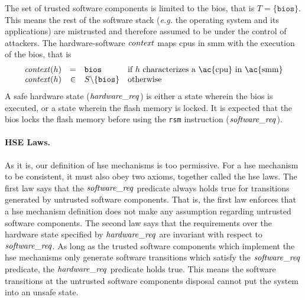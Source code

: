 \begin{example}
  \label{example:speccert:flashdef}
  The set of trusted software components is limited to the \ac{bios}, that is
  \( T = \{ \mathtt{bios} \} \).
  This means the rest of the software stack (\emph{e.g.} the operating system
  and its applications) are mistrusted and therefore assumed to be under the
  control of attackers.
  The hardware-software \( \mathit{context} \) maps \acp{cpu} in \ac{smm} with the
  execution of the \ac{bios}, that is
  \[
    \begin{array}{rcll}
      \func{context}(h) & = & \mathtt{bios} & \text{if } h \text{ characterizes
                                              a \ac{cpu} in \ac{smm}} \\
      \func{context}(h) & \in & S \backslash \{ \mathtt{bios} \} & \text{otherwise}
    \end{array}
  \]
  A safe hardware state ($\mathit{hardware\_req}$) is either a state wherein the
  \ac{bios} is executed, or a state wherein the flash memory is locked.
  It is expected that the \ac{bios} locks the flash memory before using the
  \texttt{rsm} instruction ($\mathit{software\_req}$).
\end{example}

\paragraph{HSE Laws.}
%
As it is, our definition of \ac{hse} mechanisms is too permissive.
%
For a \ac{hse} mechanism to be consistent, it must also obey two axioms,
together called the \ac{hse} laws.
%
The first law says that the $\mathit{software\_req}$ predicate always holds true
for transitions generated by untrusted software components.
%
That is, the first law enforces that a \ac{hse} mechanism definition does not
make any assumption regarding untrusted software components.
%
The second law says that the requirements over the hardware state specified by
$\mathit{hardware\_req}$ are invariant with respect to $\mathit{software\_req}$.
%
As long as the trusted software components which implement the \ac{hse}
mechanisms only generate software transitions which satisfy the
$\mathit{software\_req}$ predicate, the $\mathit{hardware\_req}$ predicate holds
true.
%
This means the software transitions at the untrusted software components
disposal cannot put the system into an unsafe state.

